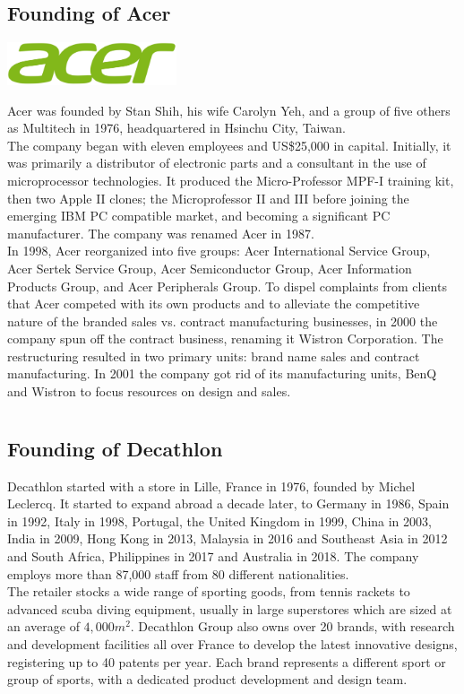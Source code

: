 \documentclass[11pt]{report}
\begin{document}
\subsection{Founding of Acer}
\vspace{2mm}\begin{center}\includegraphics[width=5cm]{./img/acerLogo.jpg}\end{center}
Acer was founded by Stan Shih, his wife Carolyn Yeh, and a group of five others as Multitech in 1976, headquartered in Hsinchu City, Taiwan.\\
\indent The company began with eleven employees and US\$25,000 in capital. Initially, it was primarily a distributor of electronic parts and a consultant in the use of microprocessor technologies. It produced the Micro-Professor MPF-I training kit, then two Apple II clones; the Microprofessor II and III before joining the emerging IBM PC compatible market, and becoming a significant PC manufacturer. The company was renamed Acer in 1987.\\
\indent In 1998, Acer reorganized into five groups: Acer International Service Group, Acer Sertek Service Group, Acer Semiconductor Group, Acer Information Products Group, and Acer Peripherals Group. To dispel complaints from clients that Acer competed with its own products and to alleviate the competitive nature of the branded sales vs. contract manufacturing businesses, in 2000 the company spun off the contract business, renaming it Wistron Corporation. The restructuring resulted in two primary units: brand name sales and contract manufacturing. In 2001 the company got rid of its manufacturing units, BenQ and Wistron to focus resources on design and sales.
\section{}
\subsection{Founding of Decathlon}
Decathlon started with a store in Lille, France in 1976, founded by Michel Leclercq. It started to expand abroad a decade later, to Germany in 1986, Spain in 1992, Italy in 1998, Portugal, the United Kingdom in 1999, China in 2003, India in 2009, Hong Kong in 2013, Malaysia in 2016 and Southeast Asia in 2012 and South Africa, Philippines in 2017 and Australia in 2018. The company employs more than 87,000 staff from 80 different nationalities.\\ \indent The retailer stocks a wide range of sporting goods, from tennis rackets to advanced scuba diving equipment, usually in large superstores which are sized at an average of $4,000m^{2}$. Decathlon Group also owns over 20 brands, with research and development facilities all over France to develop the latest innovative designs, registering up to 40 patents per year. Each brand represents a different sport or group of sports, with a dedicated product development and design team.
\end{document}

